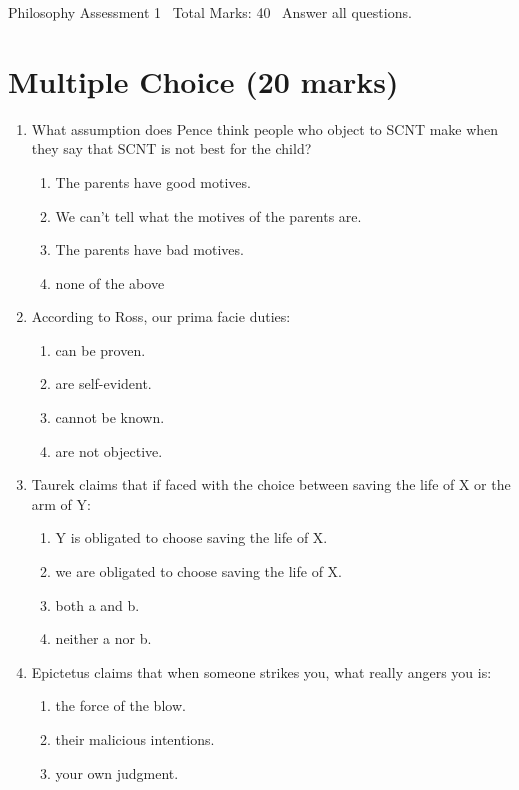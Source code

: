 \documentclass[12pt]{article}
\begin{document}
\begin{center}
Philosophy Assessment 1 \
Total Marks: 40 \
Answer all questions.
\end{center}

\section*{Multiple Choice (20 marks)}
\begin{enumerate}[label=\arabic*.]
\item What assumption does Pence think people who object to SCNT make when they say that SCNT is not best for the child?
\begin{enumerate}[label=(\alph*)]
    \item The parents have good motives.
    \item We can't tell what the motives of the parents are.
    \item The parents have bad motives.
    \item none of the above
\end{enumerate}
\item According to Ross, our prima facie duties:
\begin{enumerate}[label=(\alph*)]
    \item can be proven.
    \item are self-evident.
    \item cannot be known.
    \item are not objective.
\end{enumerate}
\item Taurek claims that if faced with the choice between saving the life of X or the arm of Y:
\begin{enumerate}[label=(\alph*)]
    \item Y is obligated to choose saving the life of X.
    \item we are obligated to choose saving the life of X.
    \item both a and b.
    \item neither a nor b.
\end{enumerate}
\item Epictetus claims that when someone strikes you, what really angers you is:
\begin{enumerate}[label=(\alph*)]
    \item the force of the blow.
    \item their malicious intentions.
    \item your own judgment.

\end{enumerate}
\end{enumerate}
\end{document}
